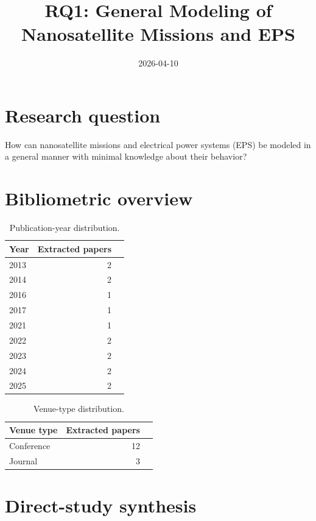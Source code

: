 \documentclass[11pt]{article}
\title{RQ1: General Modeling of Nanosatellite Missions and EPS}
\date{2026-04-10}
\begin{document}
\maketitle

\section{Research question}
How can nanosatellite missions and electrical power systems (EPS) be modeled in a general manner with minimal knowledge about their behavior?

\section{Bibliometric overview}

\begin{table}[h]
\centering
\begin{tabular}{lrr}
\hline
Year & Extracted papers \\
\hline
2013 & 2 \\
2014 & 2 \\
2016 & 1 \\
2017 & 1 \\
2021 & 1 \\
2022 & 2 \\
2023 & 2 \\
2024 & 2 \\
2025 & 2 \\
\hline
\end{tabular}
\caption{Publication-year distribution.}
\end{table}



\begin{table}[h]
\centering
\begin{tabular}{lrr}
\hline
Venue type & Extracted papers \\
\hline
Conference & 12 \\
Journal & 3 \\
\hline
\end{tabular}
\caption{Venue-type distribution.}
\end{table}

\section{Direct-study synthesis}
\end{document}
